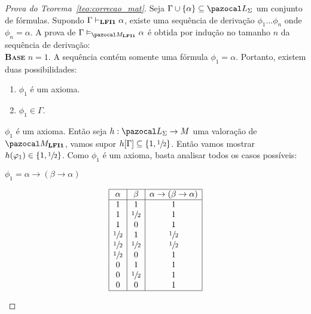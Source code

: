     \begin{proof}[Prova do Teorema~\ref{teo:correcao_mat}]
        Seja $\Gamma \cup \{\alpha\} \subseteq{} \ling{}$ um conjunto de fórmulas.
        Supondo $\Gamma \vdash_{{\normalfont\textbf{LFI1}}{}} \alpha$, existe uma sequência de derivação $\phi_{1} \ldots \phi_{n}$ onde $\phi_{n} = \alpha$. A prova de $\Gamma \conmat \alpha$ é obtida por indução no tamanho $n$ da sequência de derivação:\\

        \noindent \textbf{\textsc{Base}} $n = 1$. A sequência contém somente uma fórmula $\phi_{1} = \alpha$. Portanto, existem duas possibilidades:
        \begin{enumerate}
            \item $\phi_{1}$ é um axioma.
            \item $\phi_{1} \in \Gamma$.
        \end{enumerate}

        \begin{provaporcasos}
            
            \casodeprova{} $\phi_{1}$ é um axioma. Então seja $h : \ling{} \to M$ uma valoração de $\mat{}$, vamos supor $h[\Gamma] \subseteq \{1,\sfrac{1}{2}{}\}{}$. Então vamos mostrar $h(\varphi_{1}) \in \{1,\sfrac{1}{2}{}\}{}$. Como $\phi_{1}$ é um axioma, basta analisar todos os casos possíveis:

            \begin{provaporsubcasos}
                
                \subcasodeprova{} $\phi_{1} = \alpha \to (\beta \to \alpha)$
                    \begin{center}
                        \[
                            \begin{array}{|c|c|c|}%
                                \hline
                                \alpha      & \beta & \alpha \to (\beta \to \alpha)  \\
                                \hline%
                                1            & 1            &    1\\
                                1            & \meio{}  &    1\\
                                1            & 0            &    1\\
                                \meio{}  & 1            &    \meio{}\\
                                \meio{}  & \meio{}  &    \meio{}\\
                                \meio{}  & 0            &    1\\
                                0            & 1            &    1\\
                                0            & \meio{}  &    1\\
                                0            & 0            &    1\\
                                \hline
                            \end{array}
                        \]
                    \end{center}


\end{provaporsubcasos}
\end{provaporcasos}
\end{proof}
